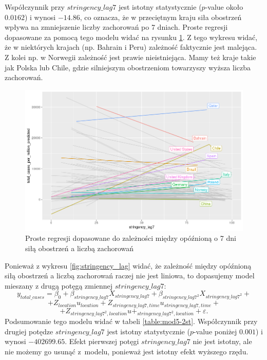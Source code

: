 \documentclass[12pt]{mwbk}
\theoremstyle{plain}
\theoremstyle{definition}
\theoremstyle{definition}
\newcommand\zrodlo[1]{\par\vspace{-3mm}{\small\textit{Źródło: }#1 }}
\begin{document}
Współczynnik przy $stringency\_lag7$ jest istotny statystycznie ($p$-value około $0.0162$) i wynosi $-14.86$, co oznacza, że w przeciętnym kraju siła obostrzeń wpływa na zmniejszenie liczby zachorowań po 7 dniach. Proste regresji dopasowane za pomocą tego modelu widać na rysunku \ref{fig:stringency_1st}. Z tego wykresu widać, że w niektórych krajach (np. Bahrain i Peru) zależność faktycznie jest malejąca. Z kolei np. w Norwegii zależność jest prawie nieistniejąca. Mamy też kraje takie jak Polska lub Chile, gdzie silniejszym obostrzeniom towarzyszy wyższa liczba zachorowań.
\newpage
\begin{figure}[!h]
	\centering
	\includegraphics[width=\linewidth]{rys/stringency_1st.png}
	\caption{Proste regresji dopasowane do zależności między opóźnioną o 7 dni siłą obostrzeń a liczbą zachorowań }
	\label{fig:stringency_1st}
	\zrodlo{Opracowanie własne}
\end{figure}

Ponieważ z wykresu \ref{fig:stringency_lag} widać, że zależność między opóźnioną siłą obostrzeń a liczbą zachorowań raczej nie jest liniowa, to dopasujemy model mieszany z drugą potęgą zmiennej $stringency\_lag7$:
$$y_{total\_cases}=\beta_0+\beta_{stringency\_lag7} X_{stringency\_lag7}+ \beta_{stringency\_lag7^2} X_{stringency\_lag7^2}+$$$$+Z_{location}u_{location}+Z_{stringency\_lag7,time}u_{stringency\_lag7,time}+$$$$+Z_{stringency\_lag7^2, location}u+_{stringency\_lag7^2, location}+\varepsilon.$$
Podsumowanie tego modelu widać w tabeli \ref{table:mod5-2st}. Współczynnik przy drugiej potędze $stringency\_lag7$ jest istotny statystycznie ($p$-value poniżej $0.001$) i wynosi $-402699.65$. Efekt pierwszej potęgi $stringency\_lag7$ nie jest istotny, ale nie możemy go usunąć z~modelu, ponieważ jest istotny efekt wyższego rzędu.
\end{document}
